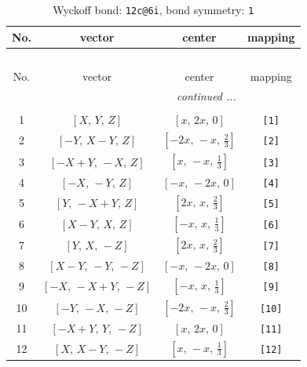 \documentclass[fleqn,8pt]{jsarticle}
\begin{document}
\begin{longtable}{cccc}
\caption{Wyckoff bond: {\tt 12c@6i}, bond symmetry: {\tt 1}}
 \\
 \hline \hline
No. & vector & center & mapping \\ \hline \endfirsthead

\multicolumn{3}{l}{\tablename\ \thetable{}} \\
 \hline \hline
No. & vector & center & mapping \\ \hline \endhead

 \hline \hline
\multicolumn{3}{r}{\footnotesize\it continued ...} \\ \endfoot

 \hline \hline
\multicolumn{3}{r}{} \\ \endlastfoot

1 & $\left[ X,\, Y,\, Z \right]$ & $\left[ x,\, 2 x,\, 0 \right]$ & {\tt [1]} \\ \hline
2 & $\left[ - Y,\, X - Y,\, Z \right]$ & $\left[ - 2 x,\, - x,\, \frac{2}{3} \right]$ & {\tt [2]} \\ \hline
3 & $\left[ - X + Y,\, - X,\, Z \right]$ & $\left[ x,\, - x,\, \frac{1}{3} \right]$ & {\tt [3]} \\ \hline
4 & $\left[ - X,\, - Y,\, Z \right]$ & $\left[ - x,\, - 2 x,\, 0 \right]$ & {\tt [4]} \\ \hline
5 & $\left[ Y,\, - X + Y,\, Z \right]$ & $\left[ 2 x,\, x,\, \frac{2}{3} \right]$ & {\tt [5]} \\ \hline
6 & $\left[ X - Y,\, X,\, Z \right]$ & $\left[ - x,\, x,\, \frac{1}{3} \right]$ & {\tt [6]} \\ \hline
7 & $\left[ Y,\, X,\, - Z \right]$ & $\left[ 2 x,\, x,\, \frac{2}{3} \right]$ & {\tt [7]} \\ \hline
8 & $\left[ X - Y,\, - Y,\, - Z \right]$ & $\left[ - x,\, - 2 x,\, 0 \right]$ & {\tt [8]} \\ \hline
9 & $\left[ - X,\, - X + Y,\, - Z \right]$ & $\left[ - x,\, x,\, \frac{1}{3} \right]$ & {\tt [9]} \\ \hline
10 & $\left[ - Y,\, - X,\, - Z \right]$ & $\left[ - 2 x,\, - x,\, \frac{2}{3} \right]$ & {\tt [10]} \\ \hline
11 & $\left[ - X + Y,\, Y,\, - Z \right]$ & $\left[ x,\, 2 x,\, 0 \right]$ & {\tt [11]} \\ \hline
12 & $\left[ X,\, X - Y,\, - Z \right]$ & $\left[ x,\, - x,\, \frac{1}{3} \right]$ & {\tt [12]} \\
\end{longtable}
\end{document}
